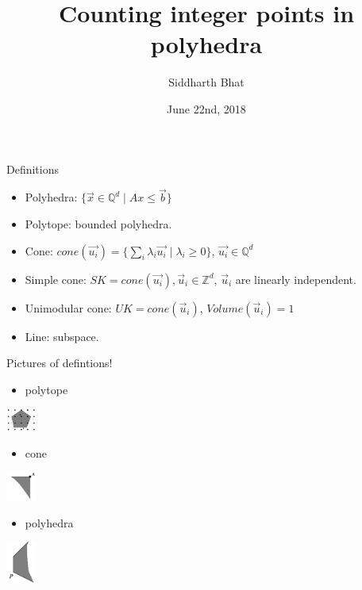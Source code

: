 \documentclass[8pt]{beamer}
\author{Siddharth Bhat}
\date{June 22nd, 2018}
\title{Counting integer points in polyhedra}
\begin{document}
\maketitle

\begin{frame}[label=sec-1]{Definitions}
\begin{itemize}
\item Polyhedra: $\Big\{ \vec{x} \in \mathbb{Q}^d \mid Ax \leq \vec{b} \Big\}$
\item Polytope: bounded polyhedra.
\item Cone: $cone(\vec{u_i}) = \Big\{ \sum_i \lambda_i \vec{u_i} \mid \lambda_i \geq 0 \Big \}$, $\vec{u_i} \in \mathbb{Q}^d$
\item Simple cone: $SK = cone(\vec{u_i}), \vec u_i \in \mathbb{Z}^d$, $\vec u_i$ are linearly independent.
\item Unimodular cone: $UK = cone(\vec u_i)$, $Volume(\vec u_i) = 1$
\item Line: subspace.
\end{itemize}
\end{frame}

\begin{frame}[label=sec-2]{Pictures of defintions!}
\begin{itemize}
\item polytope
\end{itemize}
\begin{center}
 \includegraphics[width=1cm, keepaspectratio]{res/polytope}
\end{center}

\begin{itemize}
\item cone
\end{itemize}
\begin{center}
 \includegraphics[width=1cm, keepaspectratio]{res/cone}
\end{center}

\begin{itemize}
\item polyhedra
\end{itemize}
\begin{center}
 \includegraphics[width=1cm, keepaspectratio]{res/polyhedra}
\end{center}
\end{frame}
\end{document}
